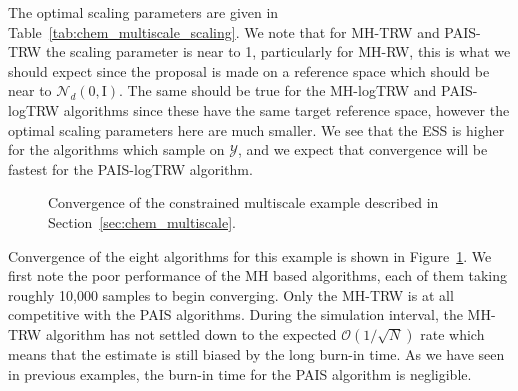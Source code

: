 \documentclass[final]{siamltex}
\begin{document}
The optimal scaling parameters are given in Table~\ref{tab:chem_multiscale_scaling}. We note that for MH-TRW and PAIS-TRW the scaling parameter is near to 1, particularly for MH-RW, this is what we should expect since the proposal is made on a reference space which should be near to $\mathcal{N}_d(0, \text{I})$. The same should be true for the MH-logTRW and PAIS-logTRW algorithms since these have the same target reference space, however the optimal scaling parameters here are much smaller. We see that the ESS is higher for the algorithms which sample on $\mathcal{Y}$, and we expect that convergence will be fastest for the PAIS-logTRW algorithm.

\begin{figure}[!htb]
\centering
{}
\caption{Convergence of the constrained multiscale example described in Section~\ref{sec:chem_multiscale}.}
\label{fig:chem_multiscale_L2}
\end{figure}

Convergence of the eight algorithms for this example is shown in Figure~\ref{fig:chem_multiscale_L2}. We first note the poor performance of the MH based algorithms, each of them taking roughly 10,000 samples to begin converging. Only the MH-TRW is at all competitive with the PAIS algorithms. During the simulation interval, the MH-TRW algorithm has not settled down to the expected $\mathcal{O}(1/\sqrt{N})$ rate which means that the estimate is still biased by the long burn-in time. As we have seen in previous examples, the burn-in time for the PAIS algorithm is negligible.
\end{document}
